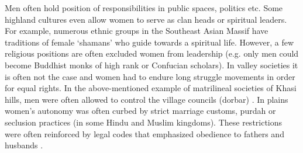 \begin{sloppypar}
 Men often hold position of responsibilities in public spaces, politics etc. Some highland cultures even allow women to serve as clan heads or spiritual leaders.  For example, numerous ethnic groups in the Southeast Asian Massif have traditions of female `shamans'  who guide towards a spiritual life. However, a few religious positions are often excluded women from leadership (e.g. only men could become Buddhist monks of high rank or Confucian scholars). In valley societies it is often not the case and women had to endure long struggle movements in order for equal rights. In the above\hyp{}mentioned example of matrilineal societies of Khasi hills, men were often allowed to control the  village councils (dorbar) \citep{WashingtonPost_2015,TheGuardian2011}. In plains women's autonomy was often curbed by strict marriage customs, purdah or seclusion practices (in some Hindu and Muslim kingdoms). These restrictions were often reinforced by legal codes that emphasized obedience to fathers and husbands \citep{Papanek_1973,Devi2019}.
\end{sloppypar}

